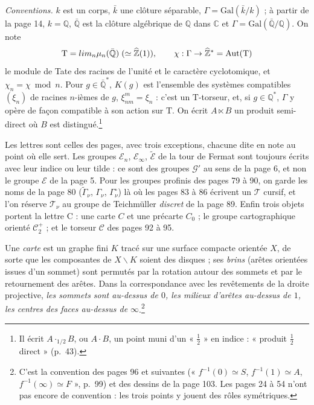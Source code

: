 \documentclass[11pt,a4paper]{article}
\begin{document}
\emph{Conventions.} $k$ est un corps, $\bar{k}$ une clôture séparable,
$\Gamma = \mathrm{Gal}(\bar{k}/k)$ ; à partir de la page 14, $k = \mathbb{Q}$,
$\bar{\mathbb{Q}}$ est la clôture algébrique de $\mathbb{Q}$ dans $\mathbb{C}$ et
$\Gamma = \mathrm{Gal}(\bar{\mathbb{Q}}/\mathbb{Q})$. On note
\[
\mathrm{T} = \varprojlim_{n} \mu_{n}(\bar{\mathbb{Q}}) \;(\simeq \widehat{\mathbb{Z}}(1)),
\qquad
\chi : \Gamma \to \widehat{\mathbb{Z}}^{*} = \mathrm{Aut}(\mathrm{T})
\]
le module de Tate des racines de l'unité et le caractère cyclotomique, et
$\chi_{n} = \chi \bmod n$. Pour $g \in \bar{\mathbb{Q}}^{*}$, $K(g)$ est
l'ensemble des systèmes compatibles $(\xi_{n})$ de racines $n$-ièmes de $g$,
$\xi_{nm}^{m} = \xi_{n}$ : c'est un $\mathrm{T}$-torseur, et, si $g \in
\mathbb{Q}^{*}$, $\Gamma$ y opère de façon compatible à son action sur
$\mathrm{T}$. On écrit $A \ltimes B$ un produit semi-direct où $B$ est
distingué.\footnote{Il écrit $A \cdot_{1/2} B$, ou $A \cdot B$, un point muni
d'un « $\tfrac12$ » en indice : « produit $\tfrac12$ direct » (p.~43).}

Les lettres sont celles des pages, avec trois exceptions, chacune dite en note
au point où elle sert. Les groupes $\mathcal{E}_{n}$, $\mathcal{E}_{\infty}$,
$\widetilde{\mathcal{E}}$ de la tour de Fermat sont toujours écrits avec leur
indice ou leur tilde : ce sont des groupes $\mathcal{G}'$ au sens de la page 6,
et non le groupe $\mathcal{E}$ de la page 5. Pour les groupes profinis des
pages 79 à 90, on garde les noms de la page 80 ($\widetilde{\Gamma}_{\nu}$,
$\Gamma_{\nu}$, $\Gamma^{\circ}_{\nu}$) là où les pages 83 à 86 écrivent un
$\mathcal{T}$ cursif, et l'on réserve $\mathcal{T}_{\nu}$ au groupe de
Teichmüller \emph{discret} de la page 89. Enfin trois objets portent la lettre
C : une carte $C$ et une précarte $C_{0}$ ; le groupe cartographique orienté
$\mathcal{C}_{2}^{+}$ ; et le torseur $\mathcal{C}$ des pages 92 à 95.

Une \emph{carte} est un graphe fini $K$ tracé sur une surface compacte
orientée $X$, de sorte que les composantes de $X \smallsetminus K$ soient des
disques ; ses \emph{brins} (arêtes orientées issues d'un sommet) sont permutés
par la rotation autour des sommets et par le retournement des arêtes. Dans la
correspondance avec les revêtements de la droite projective, \emph{les sommets
sont au-dessus de $0$, les milieux d'arêtes au-dessus de $1$, les centres des
faces au-dessus de $\infty$}.\footnote{C'est la convention des pages 96 et
suivantes (« $f^{-1}(0) \simeq S$, $f^{-1}(1) \simeq A$, $f^{-1}(\infty) \simeq
F$ », p.~99) et des dessins de la page 103. Les pages 24 à 54 n'ont pas encore
de convention : les trois points y jouent des rôles symétriques.}
\end{document}
